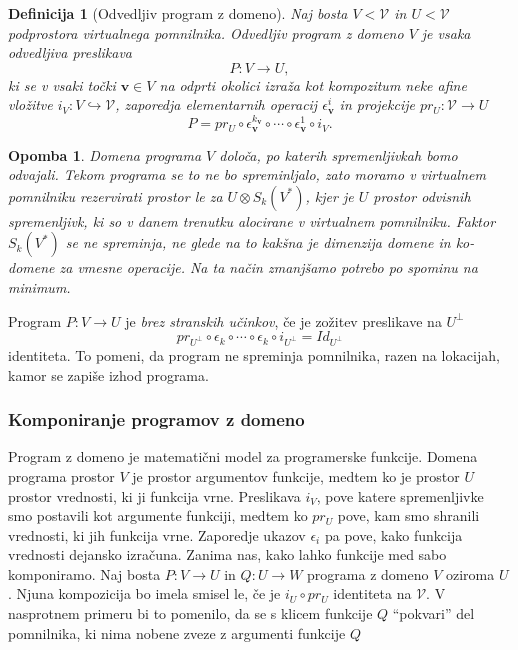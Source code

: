 \documentclass{article}
\newcommand{\VV}{\mathcal{V}}
\newcommand{\vv}{\mathbf{v}}
\newtheorem{definicija}{Definicija}[section]
\newtheorem{opomba}{Opomba}[section]
\begin{document}
\begin{definicija}[Odvedljiv program z domeno]
  Naj bosta $V<\VV$ in $U<\VV$ podprostora virtualnega pomnilnika.
  \emph{Odvedljiv program z domeno $V$} je vsaka odvedljiva preslikava
  \begin{equation}
    \label{eq:odvedljiv_program}
    P:V\to U,
  \end{equation}
 ki se v vsaki točki $\vv\in V$ na odprti okolici izraža kot kompozitum neke afine vložitve $i_V:V\hookrightarrow
 \VV$, zaporedja elementarnih operacij $\epsilon_\vv^{i}$  in projekcije $pr_U:\VV\to U$
 \begin{equation}
   \label{eq:zapis}
   P = pr_U\circ \epsilon_\vv^{k_\vv}\circ \cdots \circ \epsilon_\vv^1\circ i_V.
 \end{equation}
\end{definicija}
\begin{opomba}
  Domena programa $V$ določa, po katerih spremenljivkah bomo odvajali. Tekom
  programa se to ne bo spreminljalo, zato moramo v virtualnem pomnilniku
  rezervirati prostor le za $U\otimes S_k(V^*)$, kjer je $U$ prostor odvisnih
  spremenljivk, ki so v danem trenutku alocirane v virtualnem pomnilniku. Faktor 
$S_k(V^*)$ se ne spreminja, ne glede na to kakšna je dimenzija domene in
ko-domene za vmesne operacije. Na ta način zmanjšamo potrebo po spominu na minimum.
\end{opomba}
Program $P:V\to U$ je \emph{brez stranskih učinkov}, če je zožitev preslikave 
na $U^\perp$ 
$$ pr_{U^\perp}\circ \epsilon_k\circ \cdots \circ \epsilon_k\circ i_{U^\perp}=Id_{U^\perp}$$  
identiteta. To pomeni, da program ne spreminja pomnilnika, razen na lokacijah, 
kamor se zapiše izhod programa. 
 
\subsubsection{Komponiranje programov z domeno} 
 
Program z domeno je matematični model za programerske funkcije. Domena programa 
prostor $V$ je prostor argumentov funkcije, medtem ko je prostor $U$ prostor 
vrednosti, ki ji funkcija vrne. Preslikava $i_V$, pove katere spremenljivke smo 
postavili kot argumente funkciji, medtem ko $pr_U$ pove, kam smo shranili 
vrednosti, ki jih funkcija vrne. Zaporedje ukazov $\epsilon_i$ pa pove, kako 
funkcija vrednosti dejansko izračuna. 
Zanima nas, kako lahko funkcije med sabo komponiramo. Naj bosta $P:V\to U$ in 
$Q:U\to W$ programa z domeno $V$ oziroma $U$. Njuna kompozicija bo imela smisel 
le, če je $i_U\circ pr_U$ identiteta na $\VV$. V nasprotnem primeru bi to 
pomenilo, da se s klicem funkcije $Q$ ``pokvari'' del pomnilnika, ki nima nobene 
zveze z argumenti funkcije $Q$ 
\end{document}
